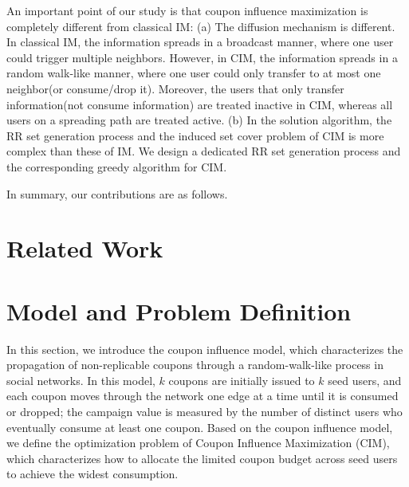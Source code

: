 \documentclass[sigconf]{acmart}
\newcommand{\CIMRIS}{\textsc{CIM-RIS}}
\begin{document}
An important point of our study is that coupon influence maximization is
completely different from classical IM:
(a) The diffusion mechanism is different. In classical IM, the information spreads in a broadcast manner, where one user could trigger multiple neighbors. However, in CIM, the information spreads in a random walk-like manner, where one user could only transfer to at most one neighbor(or consume/drop it). Moreover, the users that only transfer information(not consume information) are treated inactive in CIM, whereas all users on a spreading path are treated active. (b) In the solution algorithm, the RR set generation process and the induced set cover problem of CIM is more complex than these of IM. 
We design a dedicated RR set generation process and the corresponding greedy algorithm for CIM.



In summary, our contributions are as follows.


\section{Related Work}
\label{sec:related}


\section{Model and Problem Definition}
\label{sec:model}

In this section, we introduce the coupon influence model, which
characterizes the propagation of non-replicable coupons through a
random-walk-like process in social networks.
In this model, $k$ coupons are initially issued to $k$ seed users, and
each coupon moves through the network one edge at a time until it is
consumed or dropped; the campaign value is measured by the number of
distinct users who eventually consume at least one coupon.
Based on the coupon influence model, we define the optimization
problem of Coupon Influence Maximization (CIM), which characterizes
how to allocate the limited coupon budget across seed users to
achieve the widest consumption.
\end{document}
